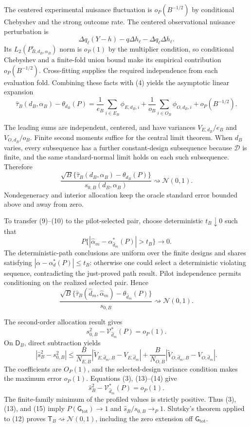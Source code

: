 The centered experimental nuisance fluctuation is \(o_P(B^{-1/2})\) by conditional Chebyshev and the strong outcome rate.  The centered observational nuisance perturbation is
\[
 \Delta q_\ell(Y-h)-q\Delta h_\ell-\Delta q_\ell\Delta h_\ell.
\]
Its \(L_2(P_{B,d_B,\alpha_B}^{\circ})\) norm is \(o_P(1)\) by the multiplier condition, so conditional Chebyshev and a finite-fold union bound make its empirical contribution \(o_P(B^{-1/2})\).  Cross-fitting supplies the required independence from each evaluation fold.  Combining these facts with (4) yields the asymptotic linear expansion
\[
 \widehat\tau_B(d_B,\alpha_B)-\theta_{d_B}(P)
 =\frac1{e_B}\sum_{i\in E_B}\phi_{E,d_B,i}
 +\frac1{o_B}\sum_{i\in O_B}\phi_{O,d_B,i}
 +o_P(B^{-1/2}). \tag{9}
\]

The leading sums are independent, centered, and have variances \(V_{E,d_B}/e_B\) and \(V_{O,d_B}/o_B\).  Finite second moments suffice for the central limit theorem.  When \(d_B\) varies, every subsequence has a further constant-design subsequence because \(\mathcal D\) is finite, and the same standard-normal limit holds on each such subsequence.  Therefore
\[
 \frac{\sqrt B\{\widehat\tau_B(d_B,\alpha_B)-\theta_{d_B}(P)\}}
 {s_{0,B}(d_B,\alpha_B)}\rightsquigarrow\mathcal N(0,1). \tag{10}
\]
Nondegeneracy and interior allocation keep the oracle standard error bounded above and away from zero.

To transfer (9)--(10) to the pilot-selected pair, choose deterministic \(t_B\downarrow0\) such that
\[
 P\{|\widehat\alpha_m-\alpha_{\widehat d_m}^*(P)|>t_B\}\to0. \tag{11}
\]
The deterministic-path conclusions are uniform over the finite designs and shares satisfying \(|\alpha-\alpha_d^*(P)|\le t_B\): otherwise one could select a deterministic violating sequence, contradicting the just-proved path result.  Pilot independence permits conditioning on the realized selected pair.  Hence
\[
 \frac{\sqrt B\{\widehat\tau_B(\widehat d_m,\widehat\alpha_m)
 -\theta_{\widehat d_m}(P)\}}{s_{0,B}}
 \rightsquigarrow\mathcal N(0,1). \tag{12}
\]

The second-order allocation result gives
\[
 s_{0,B}^2-\mathcal V_{\widehat d_m}^*(P)=o_P(1). \tag{13}
\]
On \(\mathsf D_B\), direct subtraction yields
\[
 |\widehat s_B^2-s_{0,B}^2|
 \le\frac{B}{N_{E,B}}|\widetilde V_{E,\widehat d_m,B}-V_{E,\widehat d_m}|
 +\frac{B}{N_{O,B}}|\widetilde V_{O,\widehat d_m,B}-V_{O,\widehat d_m}|. \tag{14}
\]
The coefficients are \(O_P(1)\), and the selected-design variance condition makes the maximum error \(o_P(1)\).  Equations (3), (13)--(14) give
\[
 \widehat s_B^2-\mathcal V_{\widehat d_m}^*(P)=o_P(1). \tag{15}
\]
The finite-family minimum of the profiled values is strictly positive.  Thus (3), (13), and (15) imply \(P(\mathsf G_{\mathrm{tot}})\to1\) and \(\widehat s_B/s_{0,B}\to_P1\).  Slutsky's theorem applied to (12) proves \(\mathsf T_B\rightsquigarrow\mathcal N(0,1)\), including the zero extension off \(\mathsf G_{\mathrm{tot}}\).

